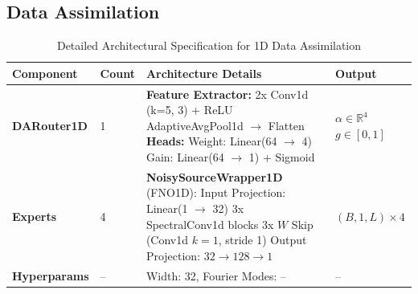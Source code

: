 \documentclass[preprint,12pt,authoryear]{elsarticle}
\begin{document}
\subsection{Data Assimilation}


\begin{table}[ht]
\centering
\caption{Detailed Architectural Specification for 1D Data Assimilation}
\label{tab:da_arch_1d}
\small
\begin{tabularx}{\textwidth}{@{} ll X l @{}}
\toprule
\textbf{Component} & \textbf{Count} & \textbf{Architecture Details} & \textbf{Output} \\ \midrule

\textbf{DARouter1D} & 1 & \textbf{Feature Extractor:} \newline 
2x Conv1d (k=5, 3) + ReLU \newline 
AdaptiveAvgPool1d $\to$ Flatten \newline 
\textbf{Heads:} \newline
Weight: Linear(64 $\to$ 4) \newline
Gain: Linear(64 $\to$ 1) + Sigmoid & $\alpha \in \mathbb{R}^{4}$ \newline $g \in [0, 1]$ \\ \addlinespace

\textbf{Experts} & 4 & \textbf{NoisySourceWrapper1D} (FNO1D): \newline
Input Projection: Linear(1 $\to$ 32) \newline
3x SpectralConv1d blocks \newline
3x $W$ Skip (Conv1d $k=1$, stride 1) \newline
Output Projection: $32 \to 128 \to 1$ & $(B, 1, L) \times 4$ \\ \addlinespace

\textbf{Hyperparams} & -- & Width: 32, Fourier Modes: -- & -- \\ 
\bottomrule
\end{tabularx}
\end{table}
\end{document}
